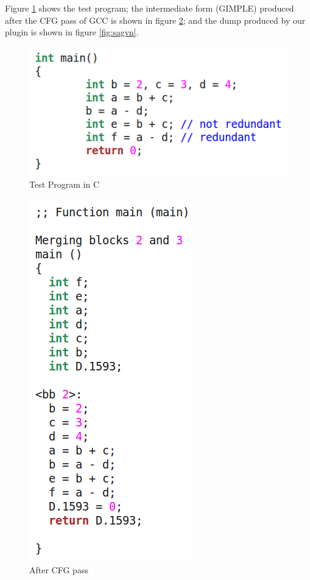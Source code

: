 Figure \ref{fig:testprog} shows the test program; the intermediate form (GIMPLE) produced after the CFG pass of GCC is shown in figure \ref{fig:cfg}; and the dump produced by our plugin is shown in figure \ref{fig:sagvn}.

\begin{figure}[htb]
\centering
\includegraphics{./test-program}
\caption{Test Program in C}
\label{fig:testprog}
\end{figure}

\begin{figure}[htb]
\centering
\includegraphics{./cfg}
\caption{After CFG pass}
\label{fig:cfg}
\end{figure}

